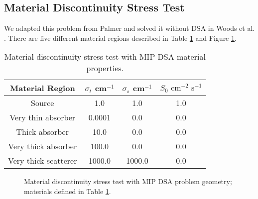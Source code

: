 \documentclass[12pt]{article}
\begin{document}
\subsection{Material Discontinuity Stress Test}
\label{sec:RZMaterialDiscontinuity}
We adapted this problem from Palmer \cite{PalmerDissertation} and solved it without DSA in Woods et al. \cite{WoodsHoDgfemXyCurved}. There are five different material regions described in Table \ref{tab:MaterialDiscontinuityProperties} and Figure \ref{fig:MaterialDiscontinuityMesh}.

\begin{table}[!htb]
\centering
{\renewcommand{\arraystretch}{1.5}
\begin{tabular}{|c|c|c|c|}
\hline
Material Region & $\sigma_t$ cm$^{-1}$ & $\sigma_s$ cm$^{-1}$ & $S_0 \text{ cm}^{-2} \text{ s}^{-1}$ \\\hline
Source & 1.0 & 1.0 & 1.0 \\
Very thin absorber & 0.0001 & 0.0 & 0.0 \\
Thick absorber & 10.0 & 0.0 & 0.0 \\
Very thick absorber & 100.0 & 0.0 & 0.0 \\
Very thick scatterer & 1000.0 & 1000.0 & 0.0 \\
\hline
\end{tabular}}
\caption{Material discontinuity stress test with MIP DSA material properties.}
\label{tab:MaterialDiscontinuityProperties}
\end{table}

\begin{figure}[!hp]
\centering
{}
\caption{Material discontinuity stress test with MIP DSA problem geometry; materials defined in Table \ref{tab:MaterialDiscontinuityProperties}.}
\label{fig:MaterialDiscontinuityMesh}
\end{figure}
\end{document}

